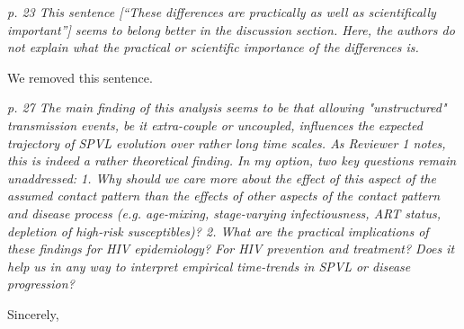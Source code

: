 \documentclass[10pt]{letter}
\newcommand{\revcomment}[1]{\emph{#1}}
\newcommand{\response}[1]{#1}
\begin{document}
\begin{letter}{
}
\revcomment{
p. 23 
This sentence [``These differences are practically as well as
scientifically important''] seems to belong better in the discussion section. Here, the authors do not explain what the practical or scientific importance of the differences is.
}

\response{
We removed this sentence.
}

\revcomment{
p. 27 The main finding of this analysis seems to be that allowing "unstructured" transmission events, be it extra-couple or uncoupled, influences the expected trajectory of SPVL evolution over rather long time scales. As Reviewer 1 notes, this is indeed a rather theoretical finding. In my option, two key questions remain unaddressed: 1. Why should we care more about the effect of this aspect of the assumed contact pattern than the effects of other aspects of the contact pattern and disease process (e.g. age-mixing, stage-varying infectiousness, ART status, depletion of high-risk susceptibles)?
2. What are the practical implications of these findings for HIV
epidemiology? For HIV prevention and treatment? Does it help us in any
way to interpret empirical time-trends in SPVL or disease progression?
}

\response{

}

\closing{Sincerely,}



\end{letter}
\end{document}
